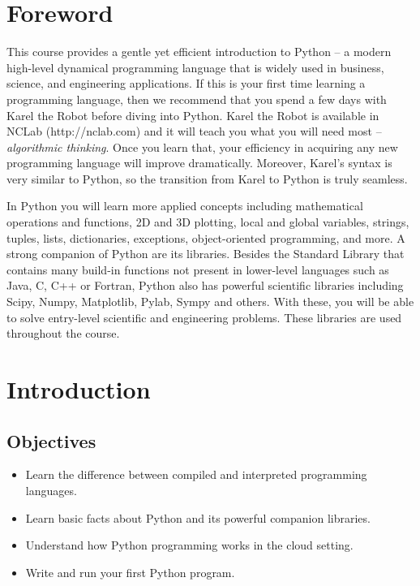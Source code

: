 \documentclass[article,A4,12pt]{llncs}
\begin{document}
\pagestyle{plain}
\setcounter{page}{1}
\section*{Foreword}
This course provides a gentle yet efficient introduction to Python -- 
a modern high-level dynamical programming language that is widely used in business, 
science, and engineering applications. If this is your first time learning 
a programming language, then we recommend that you spend a few days with 
Karel the Robot before diving into Python. Karel the Robot is available 
in NCLab (http://nclab.com) and it will teach you what you will need most --
{\em algorithmic 
thinking}. Once you learn that, your efficiency in acquiring any new programming language
will improve dramatically. Moreover, Karel's syntax is very similar to Python, 
so the transition from Karel to Python is truly seamless.

In Python you will learn more applied concepts including mathematical operations
and functions, 2D and 3D plotting, local and global variables, strings, tuples, lists, dictionaries, 
exceptions, object-oriented programming, and more. 
A strong companion of Python are its libraries. Besides the Standard Library that
contains many build-in functions not present in lower-level languages such as 
Java, C, C++ or Fortran, Python also has powerful scientific libraries including 
Scipy, Numpy, Matplotlib, Pylab, Sympy and others. With these, you will be able to 
solve entry-level scientific and engineering problems. These libraries are used
throughout the course.  

\setcounter{section}{0}
\section{Introduction}

\subsection{Objectives}

\begin{itemize}
\item Learn the difference between compiled and interpreted programming languages.
\item Learn basic facts about Python and its powerful companion libraries.
\item Understand how Python programming works in the cloud setting.
\item Write and run your first Python program.
\end{itemize}
\end{document}
